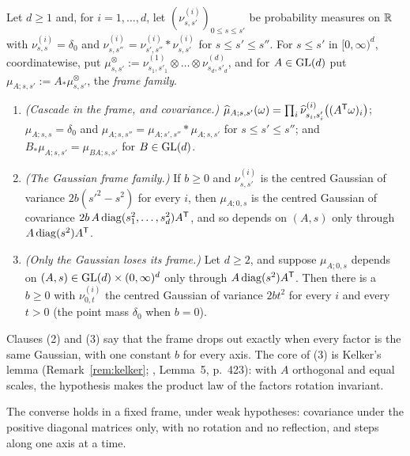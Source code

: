 \begin{proposition}\label{prop:frame-families}
Let $d \ge 1$ and, for $i = 1,\dots,d$, let $(\nu^{(i)}_{s,s'})_{0 \le s \le s'}$ be probability
measures on $\mathbb{R}$ with $\nu^{(i)}_{s,s} = \delta_0$ and
$\nu^{(i)}_{s,s''} = \nu^{(i)}_{s',s''} * \nu^{(i)}_{s,s'}$ for $s \le s' \le s''$. For
$s \le s'$ in $[0,\infty)^d$, coordinatewise, put
$\mu^{\otimes}_{s,s'} := \nu^{(1)}_{s_1,s'_1} \otimes \dots \otimes \nu^{(d)}_{s_d,s'_d}$, and for
$A \in \mathrm{GL}(d)$ put $\mu_{A;s,s'} := A_*\mu^{\otimes}_{s,s'}$, the \emph{frame family}.
\begin{enumerate}
\item \emph{(Cascade in the frame, and covariance.)}
$\widehat\mu_{A;s,s'}(\omega) = \prod_{i}\widehat\nu^{(i)}_{s_i,s'_i}\bigl((A^{\mathsf{T}}\omega)_i\bigr)$;
$\mu_{A;s,s} = \delta_0$ and $\mu_{A;s,s''} = \mu_{A;s',s''} * \mu_{A;s,s'}$ for
$s \le s' \le s''$; and $B_*\mu_{A;s,s'} = \mu_{BA;s,s'}$ for $B \in \mathrm{GL}(d)$.
\item \emph{(The Gaussian frame family.)} If $b \ge 0$ and $\nu^{(i)}_{s,s'}$ is the centred
Gaussian of variance $2b(s'^2 - s^2)$ for every $i$, then $\mu_{A;0,s}$ is the centred Gaussian of
covariance $2b\,A\operatorname{diag}(s_1^2,\dots,s_d^2)A^{\mathsf{T}}$, and so depends on $(A,s)$ only through
$A\operatorname{diag}(s^2)A^{\mathsf{T}}$.
\item \emph{(Only the Gaussian loses its frame.)} Let $d \ge 2$, and suppose $\mu_{A;0,s}$ depends
on $(A,s) \in \mathrm{GL}(d) \times (0,\infty)^d$ only through $A\operatorname{diag}(s^2)A^{\mathsf{T}}$. Then there is a
$b \ge 0$ with $\nu^{(i)}_{0,t}$ the centred Gaussian of variance $2bt^2$ for every $i$ and every
$t > 0$ (the point mass $\delta_0$ when $b = 0$).
\end{enumerate}
\end{proposition}

Clauses (2) and (3) say that the frame drops out exactly when every factor is the same Gaussian,
with one constant $b$ for every axis. The core of (3) is Kelker's lemma (Remark~\ref{rem:kelker};
, Lemma~5, p.~423): with $A$ orthogonal and equal scales, the hypothesis
makes the product law of the factors rotation invariant.

The converse holds in a fixed frame, under weak hypotheses: covariance under the positive diagonal
matrices only, with no rotation and no reflection, and steps along one axis at a time.

